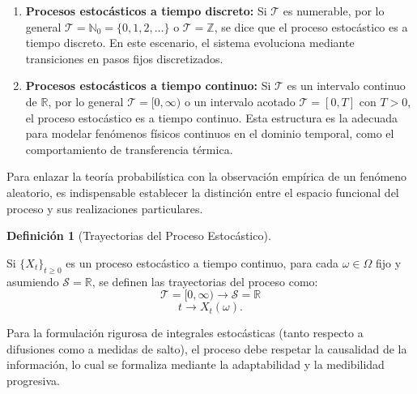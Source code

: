 \documentclass[
  spanish,
  us-letterpaper,
]{scrreprt}
\providecommand{\tightlist}{%
  \setlength{\itemsep}{0pt}\setlength{\parskip}{0pt}}
\numberwithin{equation}{section}
\theoremstyle{plain}
\theoremstyle{plain}
\theoremstyle{definition}
\newtheorem{definition}{Definición}[chapter]
\theoremstyle{plain}
\theoremstyle{remark}
\begin{document}
\begin{enumerate}
\def\labelenumi{\arabic{enumi}.}
\tightlist
\item
  \textbf{Procesos estocásticos a tiempo discreto:} Si \(\mathcal{T}\)
  es numerable, por lo general
  \(\mathcal{T} = \mathbb{N}_0 = \{0, 1, 2, \dots\}\) o
  \(\mathcal{T} = \mathbb{Z}\), se dice que el proceso estocástico es a
  tiempo discreto. En este escenario, el sistema evoluciona mediante
  transiciones en pasos fijos discretizados.
\item
  \textbf{Procesos estocásticos a tiempo continuo:} Si \(\mathcal{T}\)
  es un intervalo continuo de \(\mathbb{R}\), por lo general
  \(\mathcal{T} = [0, \infty)\) o un intervalo acotado
  \(\mathcal{T} = [0, T]\) con \(T > 0\), el proceso estocástico es a
  tiempo continuo. Esta estructura es la adecuada para modelar fenómenos
  físicos continuos en el dominio temporal, como el comportamiento de
  transferencia térmica.
\end{enumerate}

Para enlazar la teoría probabilística con la observación empírica de un
fenómeno aleatorio, es indispensable establecer la distinción entre el
espacio funcional del proceso y sus realizaciones particulares.

\begin{definition}[Trayectorias del Proceso
Estocástico]\protect\hypertarget{def-trayectoria}{}\label{def-trayectoria}

Si \(\{X_t\}_{t \geq 0}\) es un proceso estocástico a tiempo continuo,
para cada \(\omega \in \Omega\) fijo y asumiendo
\(\mathcal{S} = \mathbb{R}\), se definen las trayectorias del proceso
como: \[
    \mathcal{T} = [0, \infty) \rightarrow \mathcal{S} = \mathbb{R}
\] \[
    t \rightarrow X_t(\omega).
\]

\end{definition}

Para la formulación rigurosa de integrales estocásticas (tanto respecto
a difusiones como a medidas de salto), el proceso debe respetar la
causalidad de la información, lo cual se formaliza mediante la
adaptabilidad y la medibilidad progresiva.
\end{document}
